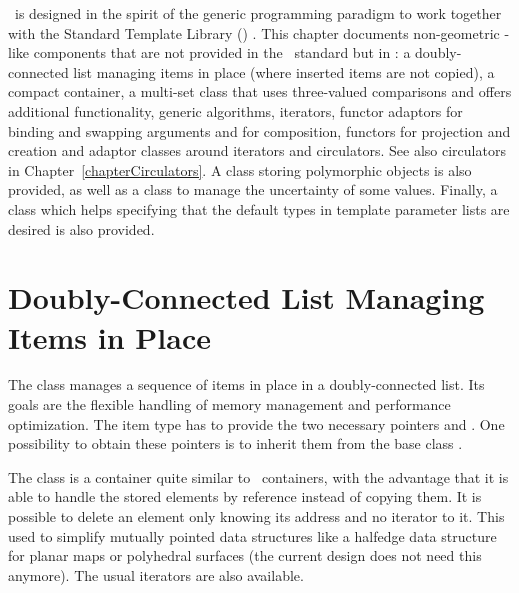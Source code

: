 



\minitoc

\cgal\ is designed in the spirit of the generic programming paradigm
to work together with the Standard Template Library (\stl)
\cite{cgal:ansi-is14882-98,cgal:a-gps-98}. This chapter documents non-geometric
\stl-like components that are not provided in the \stl\ standard but
in \cgal: a doubly-connected list managing items in place (where
inserted items are not copied), a compact container, a multi-set class that
uses three-valued comparisons and offers additional functionality,
generic algorithms, iterators, functor adaptors for binding and swapping
arguments and for composition, functors for projection and creation and
adaptor classes around iterators and circulators. See also circulators in
Chapter~\ref{chapterCirculators}.  A class storing polymorphic objects
is also provided, as well as a class to manage the uncertainty of some values.
Finally, a class which helps specifying that the default types in template
parameter lists are desired is also provided.

\section{Doubly-Connected List Managing Items in Place}

The class  manages a
sequence of items in place in a doubly-connected list. Its goals are
the flexible handling of memory management and performance
optimization. The item type has to provide the two necessary
pointers  and . One possibility
to obtain these pointers is to inherit them from the base class
.

The class  is a container quite similar
to \stl\ containers, with the advantage that it is able to handle the
stored elements by reference instead of copying them. It is possible
to delete an element only knowing its address and no iterator to it.
This used to simplify mutually pointed data structures like a halfedge
data structure for planar maps or polyhedral surfaces (the current design
does not need this anymore). The usual iterators are also available.

